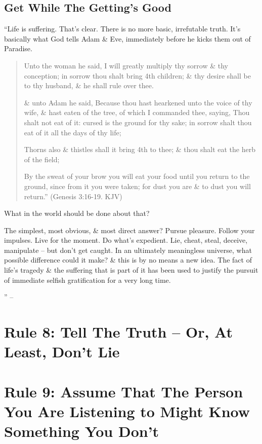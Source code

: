 \documentclass{article}
\numberwithin{equation}{section}
\begin{document}
\subsection{Get While The Getting's Good}
``Life is suffering. That's clear. There is no more basic, irrefutable truth. It's basically what God tells Adam \& Eve, immediately before he kicks them out of Paradise.
\begin{quotation}
	Unto the woman he said, I will greatly multiply thy sorrow \& thy conception; in sorrow thou shalt bring 4th children; \& thy desire shall be to thy husband, \& he shall rule over thee.
	
	\& unto Adam he said, Because thou hast hearkened unto the voice of thy wife, \& hast eaten of the tree, of which I commanded thee, saying, Thou shalt not eat of it: cursed is the ground for thy sake; in sorrow shalt thou eat of it all the days of thy life;
	
	Thorns also \& thistles shall it bring 4th to thee; \& thou shalt eat the herb of the field;
	
	By the sweat of your brow you will eat your food until you return to the ground, since from it you were taken; for dust you are \& to dust you will return.'' (Genesis 3:16-19. KJV)
\end{quotation}
What in the world should be done about that?

The simplest, most obvious, \& most direct answer? Pursue pleasure. Follow your impulses. Live for the moment. Do what's expedient. Lie, cheat, steal, deceive, manipulate -- but don't get caught. In an ultimately meaningless universe, what possible difference could it make? \& this is by no means a new idea. The fact of life's tragedy \& the suffering that is part of it has been used to justify the pursuit of immediate selfish gratification for a very long time.

'' -- \cite[pp. 183--]{Peterson2018}




\section{Rule 8: Tell The Truth -- Or, At Least, Don't Lie}


\section{Rule 9: Assume That The Person You Are Listening to Might Know Something You Don't}
\end{document}
